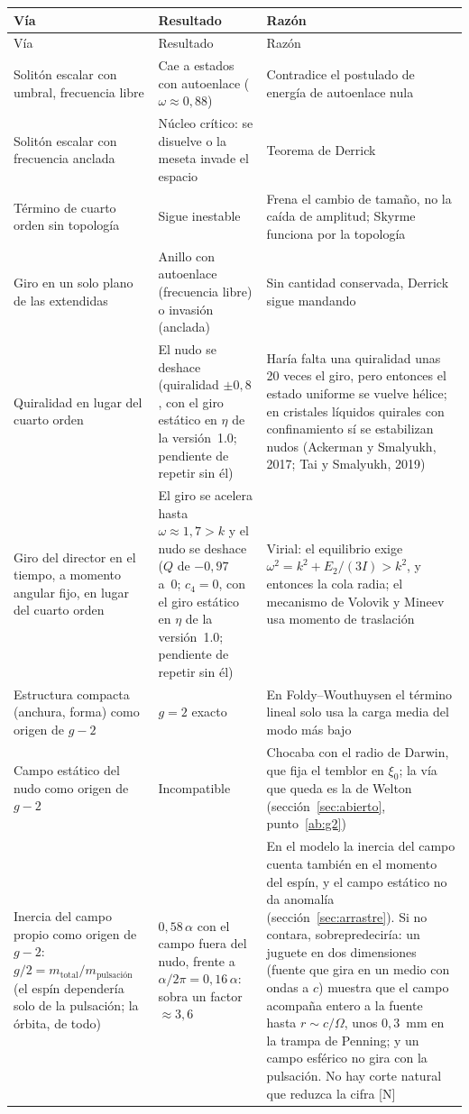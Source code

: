 \documentclass[11pt,a4paper]{article}
\newcommand{\st}[1]{\textup{[#1]}}
\begin{document}
{\footnotesize
\begin{xltabular}{\textwidth}{@{}Y Y Y@{}}
\toprule
Vía & Resultado & Razón \\
\midrule
\endfirsthead
\toprule
Vía & Resultado & Razón \\
\midrule
\endhead
\bottomrule
\endlastfoot
Solitón escalar con umbral, frecuencia libre & Cae a estados con autoenlace ($\omega\approx0,88$) & Contradice el postulado de energía de autoenlace nula \\
\addlinespace
Solitón escalar con frecuencia anclada & Núcleo crítico: se disuelve o la meseta invade el espacio & Teorema de Derrick \\
\addlinespace
Término de cuarto orden sin topología & Sigue inestable & Frena el cambio de tamaño, no la caída de amplitud; Skyrme funciona por la topología \\
\addlinespace
Giro en un solo plano de las extendidas & Anillo con autoenlace (frecuencia libre) o invasión (anclada) & Sin cantidad conservada, Derrick sigue mandando \\
\addlinespace
Quiralidad en lugar del cuarto orden & El nudo se deshace (quiralidad $\pm0,8$, con el giro estático en $\eta$ de la versión~1.0; pendiente de repetir sin él) & Haría falta una quiralidad unas 20 veces el giro, pero entonces el estado uniforme se vuelve hélice; en cristales líquidos quirales con confinamiento sí se estabilizan nudos (Ackerman y Smalyukh, 2017; Tai y Smalyukh, 2019) \\
\addlinespace
Giro del director en el tiempo, a momento angular fijo, en lugar del cuarto orden & El giro se acelera hasta $\omega\approx1,7>k$ y el nudo se deshace ($Q$ de $-0,97$ a~0; $c_4=0$, con el giro estático en $\eta$ de la versión~1.0; pendiente de repetir sin él) & Virial: el equilibrio exige $\omega^2=k^2+E_2/(3I)>k^2$, y entonces la cola radia; el mecanismo de Volovik y Mineev usa momento de traslación \\
\addlinespace
Estructura compacta (anchura, forma) como origen de $g-2$ & $g=2$ exacto & En Foldy--Wouthuysen el término lineal solo usa la carga media del modo más bajo \\
\addlinespace
Campo estático del nudo como origen de $g-2$ & Incompatible & Chocaba con el radio de Darwin, que fija el temblor en $\xi_0$; la vía que queda es la de Welton (sección~\ref{sec:abierto}, punto~\ref{ab:g2}) \\
\addlinespace
Inercia del campo propio como origen de $g-2$: $g/2=m_\text{total}/m_\text{pulsación}$ (el espín dependería solo de la pulsación; la órbita, de todo) & $0,58\,\alpha$ con el campo fuera del nudo, frente a $\alpha/2\pi=0,16\,\alpha$: sobra un factor $\approx3,6$ & En el modelo la inercia del campo cuenta también en el momento del espín, y el campo estático no da anomalía (sección~\ref{sec:arrastre}). Si no contara, sobrepredeciría: un juguete en dos dimensiones (fuente que gira en un medio con ondas a $c$) muestra que el campo acompaña entero a la fuente hasta $r\sim c/\Omega$, unos $0,3$~mm en la trampa de Penning; y un campo esférico no gira con la pulsación. No hay corte natural que reduzca la cifra \st{N} \\

\end{xltabular}}
\end{document}
